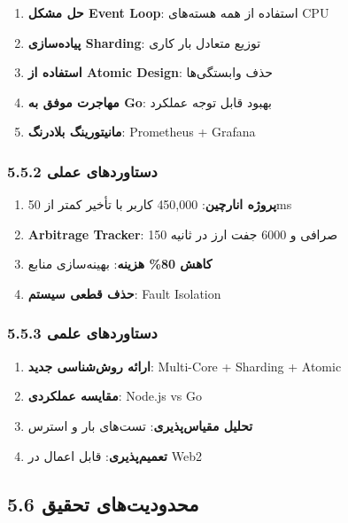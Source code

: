 \documentclass[
]{article}
\providecommand{\tightlist}{%
  \setlength{\itemsep}{0pt}\setlength{\parskip}{0pt}}
\begin{document}
\begin{enumerate}
\def\labelenumi{\arabic{enumi}.}
\tightlist
\item
  \textbf{حل مشکل Event Loop}: استفاده از همه هسته‌های CPU
\item
  \textbf{پیاده‌سازی Sharding}: توزیع متعادل بار کاری
\item
  \textbf{استفاده از Atomic Design}: حذف وابستگی‌ها
\item
  \textbf{مهاجرت موفق به Go}: بهبود قابل توجه عملکرد
\item
  \textbf{مانیتورینگ بلادرنگ}: Prometheus + Grafana
\end{enumerate}

\subsubsection{5.5.2 دستاوردهای
عملی}\label{ux62fux633ux62aux627ux648ux631ux62fux647ux627ux6cc-ux639ux645ux644ux6cc}

\begin{enumerate}
\def\labelenumi{\arabic{enumi}.}
\tightlist
\item
  \textbf{پروژه انارچین}: 450,000 کاربر با تأخیر کمتر از 50ms
\item
  \textbf{Arbitrage Tracker}: 150 صرافی و 6000 جفت ارز در ثانیه
\item
  \textbf{کاهش 80\% هزینه}: بهینه‌سازی منابع
\item
  \textbf{حذف قطعی سیستم}: Fault Isolation
\end{enumerate}

\subsubsection{5.5.3 دستاوردهای
علمی}\label{ux62fux633ux62aux627ux648ux631ux62fux647ux627ux6cc-ux639ux644ux645ux6cc}

\begin{enumerate}
\def\labelenumi{\arabic{enumi}.}
\tightlist
\item
  \textbf{ارائه روش‌شناسی جدید}: Multi-Core + Sharding + Atomic
\item
  \textbf{مقایسه عملکردی}: Node.js vs Go
\item
  \textbf{تحلیل مقیاس‌پذیری}: تست‌های بار و استرس
\item
  \textbf{تعمیم‌پذیری}: قابل اعمال در Web2
\end{enumerate}

\subsection{5.6 محدودیت‌های
تحقیق}\label{ux645ux62dux62fux648ux62fux6ccux62aux647ux627ux6cc-ux62aux62dux642ux6ccux642-1}
\end{document}
